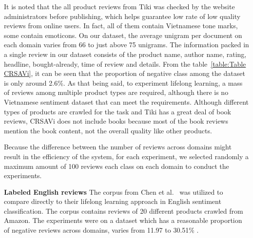It is noted that the all product reviews from Tiki was checked by the website administrators before publishing, which helps guarantee low rate of low quality reviews from online users.
In fact, all of them contain Vietnamese tone marks, some contain emoticons. 
On our dataset, the average unigram per document on each domain varies from 66 to just above 75 unigrams.
The information packed in a single review in our dataset consists of the product name, author name, rating, headline, bought-already, time of review and details.
From the table~\ref{table:Table CRSAVi}, it can be seen that the proportion of negative class among the dataset is only around 2.6\%.
As that being said, to experiment lifelong learning, a mass of reviews among multiple product types are required, although there is no Vietnamese sentiment dataset that can meet the requirements.
Although different types of products are crawled for the task and Tiki has a great deal of book reviews, CRSAVi does not include books because most of the book reviews mention the book content, not the overall quality like other products.

Because the difference between the number of reviews across domains might result in the efficiency of the system, for each experiment, we selected randomly a maximum amount of 100 reviews each class on each domain to conduct the experiments. 


\textbf{Labeled English reviews} The corpus from Chen et al.~\cite{chen-ma-liu:2015:ACL-IJCNLP} was utilized to compare directly to their lifelong learning approach in English sentiment classification.
The corpus contains reviews of 20 different products crawled from Amazon.
The experiments were on a dataset which has a reasonable proportion of negative reviews across domains, varies from 11.97 to 30.51\% .

